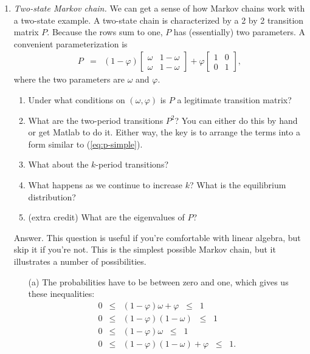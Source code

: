 \documentclass[11pt]{article}
\begin{document}
\begin{enumerate}
\item {\it Two-state Markov chain.\/}
We can get a sense of how Markov chains work with a two-state example.
A two-state chain is characterized by a 2 by 2 transition matrix $P$.
Because the rows sum to one, $P$ has (essentially) two parameters.
A convenient parameterization is
\begin{eqnarray}
    P &=& (1-\varphi)
        \left[
        \begin{array}{cc}
        \omega & 1-\omega \\ \omega & 1-\omega
        \end{array}
        \right]
        + \varphi
        \left[
        \begin{array}{cc}
        1  & 0  \\  0  & 1
        \end{array}
        \right] ,
        \label{eq:p-simple}
\end{eqnarray}
where the two parameters are $\omega$ and $\varphi$.
%
\begin{enumerate}
\item Under what conditions on $(\omega, \varphi)$ is $P$ a legitimate
transition matrix?
\item What are the two-period transitions $P^2$?
You can either do this by hand or get Matlab to do it.  Either way,
the key is to arrange the terms into a form similar to (\ref{eq:p-simple}).
\item What about the $k$-period transitions?
\item What happens as we continue to increase $k$?
What is the equilibrium distribution?
\item (extra credit) What are the eigenvalues of $P$?
\end{enumerate}
%
Answer.
This question is useful if you're comfortable with linear algebra,
but skip it if you're not.
This is the simplest possible Markov chain,
but it illustrates a number of possibilities.
\begin{enumerate}
\item [(a)] The probabilities have to be between zero and one,
which gives us these inequalities:
\begin{eqnarray*}
    0 &\leq& (1-\varphi) \omega + \varphi \;\;\leq\;\; 1 \\
    0 &\leq& (1-\varphi) (1-\omega) \;\;\leq\;\; 1 \\
    0 &\leq& (1-\varphi) \omega \;\;\leq\;\; 1 \\
    0 &\leq& (1-\varphi) (1-\omega) + \varphi \;\;\leq\;\; 1 .

\end{eqnarray*}
\end{enumerate}
\end{enumerate}
\end{document}
